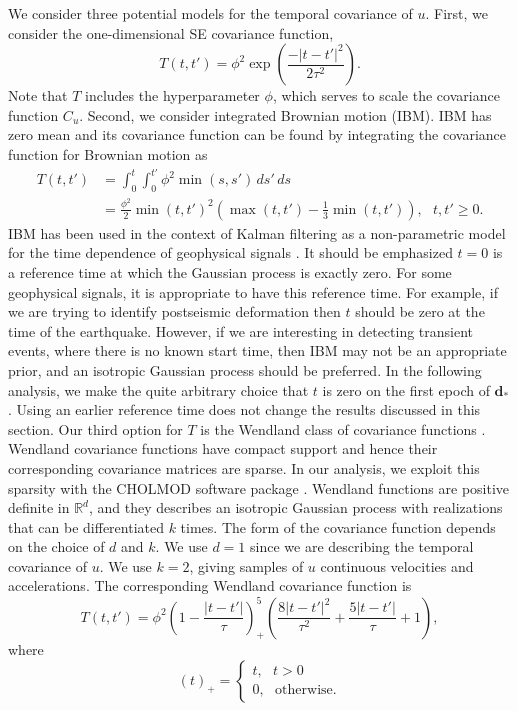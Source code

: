 We consider three potential models for the temporal covariance of $u$. First, we consider the one-dimensional SE covariance function, 
\begin{equation}\label{ch5:eq:TimeSE}
T(t,t') = \phi^2\exp\left(\frac{-|t - t'|^2}{2\tau^2}\right).
\end{equation}
Note that $T$ includes the hyperparameter $\phi$, which serves to scale the covariance function $C_u$. Second, we consider integrated Brownian motion (IBM). IBM has zero mean and its covariance function can be found by integrating the covariance function for Brownian motion as
\begin{align}\label{ch5:eq:IBM}
T(t,t') &= \int_0^t \int_0^{t'} \phi^2 \min(s,s') \,ds'\,ds \\
        &= \frac{\phi^2}{2}\min(t,t')^2 \left(\max(t,t') - \frac{1}{3}\min(t,t')\right), \ \ \ t,t' \geq 0.
\end{align}
IBM has been used in the context of Kalman filtering as a non-parametric model for the time dependence of geophysical signals \citep[e.g.,][]{Segall1997,McGuire2003,Ohtani2010,Hines2016a}. It should be emphasized $t=0$ is a reference time at which the Gaussian process is exactly zero. For some geophysical signals, it is appropriate to have this reference time. For example, if we are trying to identify postseismic deformation then $t$ should be zero at the time of the earthquake.  However, if we are interesting in detecting transient events, where there is no known start time, then IBM may not be an appropriate prior, and an isotropic Gaussian process should be preferred. In the following analysis, we make the quite arbitrary choice that $t$ is zero on the first epoch of $\mathbf{d}_*$. Using an earlier reference time does not change the results discussed in this section. Our third option for $T$ is the Wendland class of covariance functions \citep{Wendland2005}. Wendland covariance functions have compact support and hence their corresponding covariance matrices are sparse. In our analysis, we exploit this sparsity with the CHOLMOD software package \citep{Chen2008}. Wendland functions are positive definite in $\mathbb{R}^d$, and they describes an isotropic Gaussian process with realizations that can be differentiated $k$ times. The form of the covariance function depends on the choice of $d$ and $k$. We use $d=1$ since we are describing the temporal covariance of $u$. We use $k=2$, giving samples of $u$ continuous velocities and accelerations. The corresponding Wendland covariance function is 
\begin{equation}\label{ch5:eq:Wendland}
T(t,t') = \phi^2\left(1 - \frac{|t - t'|}{\tau}\right)^5_+ \left(\frac{8|t - t'|^2}{\tau^2} + \frac{5|t - t'|}{\tau} + 1\right), 
\end{equation}
where
\begin{equation}
(t)_+ = 
\begin{cases}
t, \ \ \ t > 0 \\
0, \ \ \ \mathrm{otherwise}.
\end{cases}
\end{equation}

